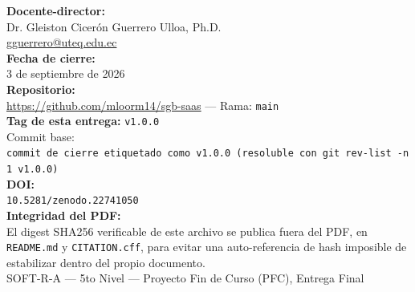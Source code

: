 \begin{titlepage}
{\normalsize\bfseries Docente-director:}\\
Dr. Gleiston Cicerón Guerrero Ulloa, Ph.D.\\
\small \href{mailto:gguerrero@uteq.edu.ec}{gguerrero@uteq.edu.ec}\\[1cm]

{\normalsize\bfseries Fecha de cierre:}\\
3 de septiembre de 2026\\[1cm]

{\normalsize\bfseries Repositorio:}\\
\url{https://github.com/mloorm14/sgb-saas} \quad --- \quad Rama: \texttt{main}\\[0.5cm]

{\normalsize\bfseries Tag de esta entrega:} \texttt{v1.0.0}\\[0.2cm]
{\small Commit base:}\\
{\small\texttt{commit de cierre etiquetado como v1.0.0 (resoluble con \texttt{git rev-list -n 1 v1.0.0})}}\\[0.5cm]

{\normalsize\bfseries DOI:}\\
{\small \texttt{10.5281/zenodo.22741050}}\\[0.5cm]

{\normalsize\bfseries Integridad del PDF:}\\
{\small El digest SHA256 verificable de este archivo se publica fuera del
PDF, en \texttt{README.md} y \texttt{CITATION.cff}, para evitar una
auto-referencia de hash imposible de estabilizar dentro del propio
documento.}\\[0.5cm]

\vfill
{\small SOFT-R-A --- 5to Nivel --- Proyecto Fin de Curso (PFC), Entrega Final}
\end{titlepage}
